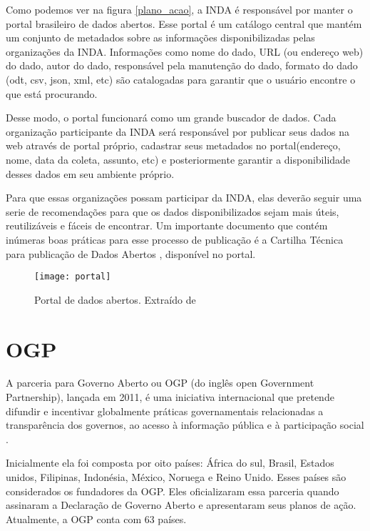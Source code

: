 Como podemos ver na figura \ref{plano_acao}, a INDA é responsável por manter o portal brasileiro de dados abertos. Esse portal é um catálogo central que mantém um conjunto de metadados sobre as informações disponibilizadas pelas organizações da INDA. Informações como nome do dado, URL (ou endereço web) do dado, autor do dado, responsável pela manutenção do dado, formato do dado (odt, csv, json, xml, etc) são catalogadas para garantir que o usuário encontre o que está procurando. 

Desse modo, o portal funcionará como um grande buscador de dados. Cada organização participante da INDA será responsável por publicar seus dados na web através de portal próprio, cadastrar seus metadados no portal(endereço, nome, data da coleta, assunto, etc) e posteriormente garantir a disponibilidade desses dados em seu ambiente próprio.

Para que essas organizações possam participar da INDA, elas deverão seguir uma serie de recomendações para que os dados disponibilizados sejam mais úteis, reutilizáveis e fáceis de encontrar. Um importante documento que contém inúmeras boas práticas para esse processo de publicação é a Cartilha Técnica 	para publicação de Dados Abertos \cite{cartilha}, disponível no portal.

\graphicspath{{figuras/}}
\begin{figure}[H]
	\centering
	\texttt{[image: portal]}
	\caption{Portal de dados abertos. Extraído de \cite{dadosabertos} }
	\label{portal}
\end{figure}

\section{OGP}
\label{sec-padroes-sl} 

A parceria para Governo Aberto ou OGP (do inglês open Government Partnership), lançada em 2011, é uma iniciativa internacional que pretende difundir e incentivar globalmente práticas governamentais relacionadas a transparência dos governos, ao acesso à informação pública e à participação social \cite{mapaogp}.

Inicialmente ela foi composta por oito países: África do sul, Brasil, Estados unidos, Filipinas, Indonésia, México, Noruega e Reino Unido. Esses países são considerados os fundadores da OGP. Eles oficializaram essa parceria quando assinaram a Declaração de Governo Aberto e apresentaram seus planos de ação. Atualmente, a OGP conta com 63 países.

